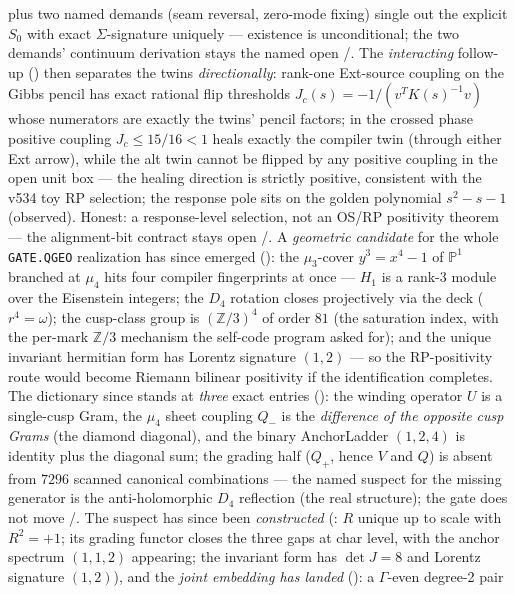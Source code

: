 \documentclass[11pt,a4paper]{article}
\theoremstyle{definition}
\begin{document}
\begin{keybox}
plus two named demands (seam reversal, zero-mode fixing) single out the
explicit $S_0$ with exact $\Sigma$-signature uniquely --- existence is
unconditional; the two demands' continuum derivation stays the named
open \mE/\mC.  The \emph{interacting} follow-up
() then separates the twins
\emph{directionally}: rank-one Ext-source coupling on the Gibbs pencil
has exact rational flip thresholds $J_c(s)=-1/(v^{T}K(s)^{-1}v)$ whose
numerators are exactly the twins' pencil factors; in the crossed phase
positive coupling $J_c\le 15/16<1$ heals exactly the compiler twin
(through either Ext arrow), while the alt twin cannot be flipped by any
positive coupling in the open unit box --- the healing direction is
strictly positive, consistent with the v534 toy RP selection; the
response pole sits on the golden polynomial $s^2-s-1$ (observed).
Honest: a response-level selection, not an OS/RP positivity theorem ---
the alignment-bit contract stays open \mE/\mC.  A \emph{geometric
candidate} for the whole \texttt{GATE.QGEO} realization has since
emerged (): the $\mu_3$-cover
$y^3=x^4-1$ of $\mathbb{P}^1$ branched at $\mu_4$ hits four compiler
fingerprints at once --- $H_1$ is a rank-3 module over the Eisenstein
integers; the $D_4$ rotation closes projectively via the deck
($r^4=\omega$); the cusp-class group is $(\mathbb{Z}/3)^4$ of order
$81$ (the saturation index, with the per-mark $\mathbb{Z}/3$ mechanism
the self-code program asked for); and the unique invariant hermitian
form has Lorentz signature $(1,2)$ --- so the RP-positivity route
would become Riemann bilinear positivity if the identification
completes.  The dictionary since stands at \emph{three} exact entries
(): the winding operator $U$ is a
single-cusp Gram, the $\mu_4$ sheet coupling $Q_-$ is the
\emph{difference of the opposite cusp Grams} (the diamond diagonal),
and the binary AnchorLadder $(1,2,4)$ is identity plus the diagonal
sum; the grading half ($Q_+$, hence $V$ and $Q$) is absent from $7296$
scanned canonical combinations --- the named suspect for the missing
generator is the anti-holomorphic $D_4$ reflection (the real
structure); the gate does not move \mE/\mC.  The suspect has since
been \emph{constructed} (: $R$ unique
up to scale with $R^2=+1$; its grading functor closes the three gaps
at char level, with the anchor spectrum $(1,1,2)$ appearing; the
invariant form has $\det J=8$ and Lorentz signature $(1,2)$), and the
\emph{joint embedding has landed}
(): a $\Gamma$-even degree-2 pair

\end{keybox}
\end{document}
